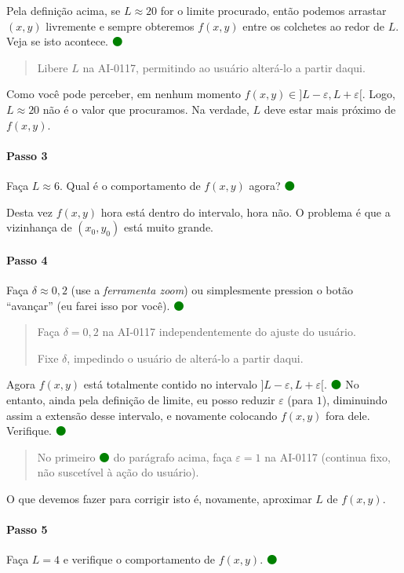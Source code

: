 \documentclass[fleqn,12pt]{article}
\newenvironment{ct}{\begin{quotation}\color{red!30!black}\sffamily\small}{\end{quotation}} %
\newcommand\proceed{\textcolor{green}{$\medbullet$}\xspace}
\newcommand\pt{\ensuremath{(x,y)}\xspace}
\newcommand\ptzero{\ensuremath{(x_0,y_0)}\xspace}
\begin{document}
    Pela definição acima, se $L \approx 20$ for o limite procurado, então podemos arrastar \pt livremente e sempre obteremos $f(x,y)$ entre os colchetes ao redor de $L$. Veja se isto acontece. \proceed

    \begin{ct}
	Libere $L$ na AI-0117, permitindo ao usuário alterá-lo a partir daqui.
    \end{ct}

    Como você pode perceber, em nenhum momento $f(x,y) \in ]L - \varepsilon, L + \varepsilon[$. Logo, $L \approx 20$ não é o valor que procuramos. Na verdade, $L$ deve estar mais próximo de $f(x,y)$.

    \paragraph{Passo 3} Faça $L \approx 6$. Qual é o comportamento de $f(x,y)$ agora? \proceed

    Desta vez $f(x,y)$ hora está dentro do intervalo, hora não. O problema é que a vizinhança de \ptzero está muito grande.

    \paragraph{Passo 4} Faça $\delta \approx 0,2$ (use a \emph{ferramenta zoom}) ou simplesmente pression o botão ``avançar'' (eu farei isso por você). \proceed

    \begin{ct}
	Faça $\delta = 0,2$ na AI-0117 independentemente do ajuste do usuário.

	Fixe $\delta$, impedindo o usuário de alterá-lo a partir daqui.
    \end{ct}

    Agora $f(x,y)$ está totalmente contido no intervalo $]L - \varepsilon, L + \varepsilon[$. \proceed No entanto, ainda pela definição de limite, eu posso reduzir $\varepsilon$ (para $1$), diminuindo assim a extensão desse intervalo, e novamente colocando $f(x,y)$ fora dele. Verifique. \proceed

    \begin{ct}
	No primeiro \proceed do parágrafo acima, faça $\varepsilon = 1$ na AI-0117 (continua fixo, não suscetível à ação do usuário).
    \end{ct}

    O que devemos fazer para corrigir isto é, novamente, aproximar $L$ de $f(x,y)$.

    \paragraph{Passo 5} Faça $L = 4$ e verifique o comportamento de $f(x,y)$. \proceed
\end{document}
